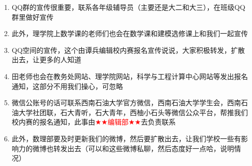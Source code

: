 \documentclass[12pt]{ctexart}
\begin{document}
\begin{proposition}[线下宣传]
\begin{enumerate}
	\item QQ群的宣传很重要，联系各年级辅导员（主要还是大二和大三），在班级QQ群里做好宣传
	\item 此外，理学院上数学课的老师们也会在数学课和建模选修课上和我们一起宣传
	\item QQ空间的宣传，这个由谭兵编辑校内赛报名宣传说说，大家积极转发，扩散出去，让更多的人知道
	\item 田老师也会在教务处网站、理学院网站，科学与工程计算中心网站等发出报名通知，这部分不用我们操心，可忽略
	\item 微信公账号的话可联系西南石油大学官方微信，西南石油大学学生会，西南石油大学社团联，石大青听，石大青年，西柚小石头等微信公众平台，帮推我们校内赛的报名通知，此事由\textcolor{red}{$\bigstar\bigstar$编辑部$\bigstar\bigstar$}去负责联系
	\item 此外，数理部要及时更新我们的微博，然后要扩散出去，让我们学校一些有影响力的微博也转发出去（可以和这些微博私聊，然后态度好一点哈，说明情况）
\end{enumerate}
\end{proposition}
\end{document}
